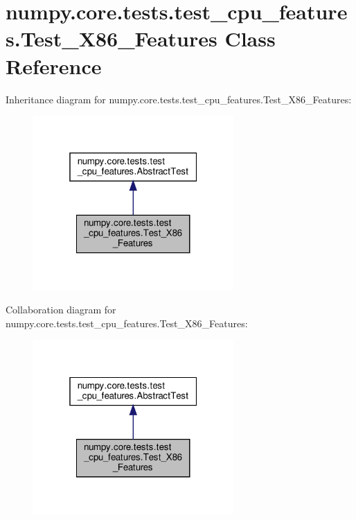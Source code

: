\hypertarget{classnumpy_1_1core_1_1tests_1_1test__cpu__features_1_1Test__X86__Features}{}\section{numpy.\+core.\+tests.\+test\+\_\+cpu\+\_\+features.\+Test\+\_\+\+X86\+\_\+\+Features Class Reference}
\label{classnumpy_1_1core_1_1tests_1_1test__cpu__features_1_1Test__X86__Features}


Inheritance diagram for numpy.\+core.\+tests.\+test\+\_\+cpu\+\_\+features.\+Test\+\_\+\+X86\+\_\+\+Features\+:
\nopagebreak
\begin{figure}[H]
\begin{center}
\leavevmode
\includegraphics[width=217pt]{classnumpy_1_1core_1_1tests_1_1test__cpu__features_1_1Test__X86__Features__inherit__graph}
\end{center}
\end{figure}


Collaboration diagram for numpy.\+core.\+tests.\+test\+\_\+cpu\+\_\+features.\+Test\+\_\+\+X86\+\_\+\+Features\+:
\nopagebreak
\begin{figure}[H]
\begin{center}
\leavevmode
\includegraphics[width=217pt]{classnumpy_1_1core_1_1tests_1_1test__cpu__features_1_1Test__X86__Features__coll__graph}
\end{center}
\end{figure}
